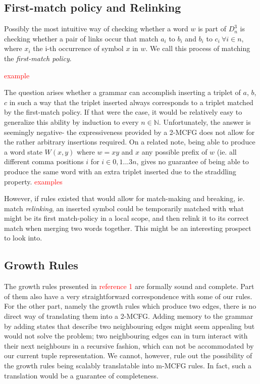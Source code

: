 \documentclass[nonatbib,numbers,10pt]{sigplanconf}
\newcommand\todo[1]{\textcolor{red}{#1}}
\begin{document}
\subsection{First-match policy and Relinking}
Possibly the most intuitive way of checking whether a word $w$ is part of $D^3_n$ is checking whether a pair of links occur that match $a_i$ to $b_i$ and $b_i$ to $c_i \ \forall i \in n$, where $x_i$ the i-th occurrence of symbol $x$ in $w$. We call this process of matching the \textit{first-match policy}.

\todo{example}

The question arises whether a grammar can accomplish inserting a triplet of $a$, $b$, $c$ in such a way that the triplet inserted always corresponds to a triplet matched by the first-match policy. If that were the case, it would be relatively easy to generalize this ability by induction to every $n \in \mathbb{N}$. Unfortunately, the answer is seemingly negative- the expressiveness provided by a 2-MCFG does not allow for the rather arbitrary insertions required. On a related note, being able to produce a word state $W(x,y)$ where $w=xy$ and $x$ any possible prefix of $w$ (ie. all different comma positions $i$ for $i \in 0,1...3n$, gives no guarantee of being able to produce the same word with an extra triplet inserted due to the straddling property.
\todo{examples}

However, if rules existed that would allow for match-making and breaking, ie. match \textit{relinking}, an inserted symbol could be temporarily matched with what might be its first match-policy in a local scope, and then relink it to its correct match when merging two words together. This might be an interesting prospect to look into.
\subsection{Growth Rules}
The growth rules presented in \todo{reference 1} are formally sound and complete. Part of them also have a very straightforward correspondence with some of our rules. For the other part, namely the growth rules which produce two edges, there is no direct way of translating them into a 2-MCFG. Adding memory to the grammar by adding states that describe two neighbouring edges might seem appealing but would not solve the problem; two neighbouring edges can in turn interact with their next neighbours in a recursive fashion, which can not be accommodated by our current tuple representation. We cannot, however, rule out the possibility of the growth rules being scalably translatable into m-MCFG rules. In fact, such a translation would be a guarantee of completeness.
\end{document}
